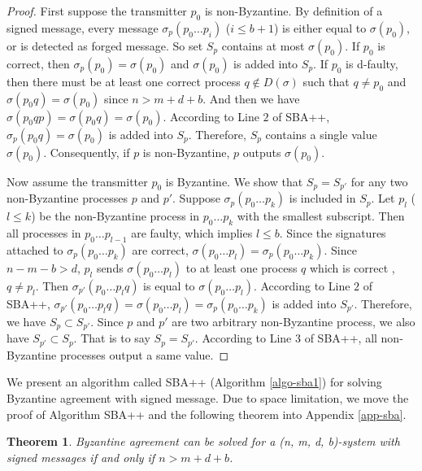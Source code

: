 \documentclass[11pt,conference,compsoc,onecolumn,romanappendices]{IEEEtran}
\newcommand{\nin}{\not\in}
\newtheorem{theorem}{Theorem}
\begin{document}
\begin{proof}
  First suppose the transmitter $p_0$ is non-Byzantine. By definition of a signed
  message, every message $\sigma_p (p_0 \ldots p_i)$ ($i \leqslant b + 1$) is
  either equal to $\sigma (p_0)$, or is detected as forged message. So set
  $S_p$ contains at most $\sigma (p_0)$. If $p_0$ is correct, then
  $\sigma_p (p_0) = \sigma (p_0)$ and $\sigma (p_0)$ is added into $S_p$. If
  $p_0$ is d-faulty, then there must be at least one correct process $q
  \nin D (\sigma)$ such that $q \neq p_0$ and $\sigma (p_0 q) = \sigma (p_0)$
  since $n > m + d + b$. And then we have $\sigma (p_0 q p) = \sigma (p_0 q) =
  \sigma (p_0)$. According to Line $2$ of SBA++, $\sigma_p (p_0 q) =
  \sigma (p_0)$ is added into $S_p$. Therefore, $S_p$ contains a single value
  $\sigma (p_0)$. Consequently, if $p$ is non-Byzantine, $p$ outputs $\sigma (p_0)$.
  
  Now assume the transmitter $p_0$ is Byzantine. We show that $S_p = S_{p'}$
  for any two non-Byzantine processes $p$ and $p'$. Suppose $\sigma_p (p_0 \ldots
  p_k)$ is included in $S_p$. Let $p_l$ ($l \leqslant k$) be the non-Byzantine
  process in $p_0 \ldots p_k$ with the smallest subscript. Then all processes
  in $p_0 \ldots p_{l - 1}$ are faulty, which implies $l \leqslant b$. Since
  the signatures attached to $\sigma_p (p_0 \ldots p_k)$ are correct, $\sigma
  (p_0 \ldots p_l) = \sigma_p (p_0 \ldots p_k)$. Since $n - m - b > d$, $p_l$
  sends $\sigma (p_0 \ldots p_l)$ to at least one process $q$ which is correct
  , $q \neq p_l$. Then $\sigma_{p'} (p_0 \ldots p_l q)$
  is equal to $\sigma (p_0 \ldots p_l)$. According to Line $2$ of
  SBA++, $\sigma_{p'} (p_0 \ldots p_l q) = \sigma (p_0 \ldots p_l) =
  \sigma_p (p_0 \ldots p_k)$ is added into $S_{p'}$. Therefore, we have $S_p
  \subset S_{p'}$. Since $p$ and $p'$ are two arbitrary non-Byzantine process, we
  also have $S_{p'} \subset S_p$. That is to say $S_p = S_{p'}$. According to
  Line $3$ of SBA++, all non-Byzantine processes output a same value.
\end{proof}
\fi

We present an algorithm called SBA++ (Algorithm \ref{algo-sba1}) for solving Byzantine agreement with signed message.
Due to space limitation, we move the proof of Algorithm SBA++ and the following theorem into Appendix \ref{app-sba}.

\begin{theorem}
  \label{thm-sba}Byzantine agreement can be solved for a (n, m, d, b)-system
  with signed messages if and only if $n > m + d + b$.
\end{theorem}
\end{document}

